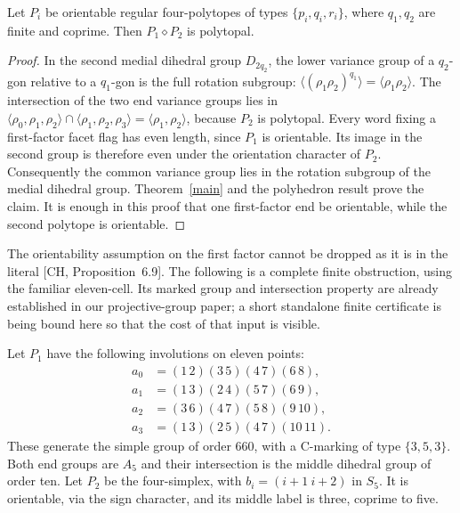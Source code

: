 \documentclass[a4paper,11pt]{article}
\newcommand{\gen}[1]{\langle#1\rangle}\newcommand{\Aut}{\operatorname{Aut}}
\newcommand{\mix}{\mathbin{\diamond}}\newcommand{\Alt}{\operatorname{Alt}}
\begin{document}
\begin{proposition}\label{coprime}
Let $P_i$ be orientable regular four-polytopes of types
$\{p_i,q_i,r_i\}$, where $q_1,q_2$ are finite and coprime.
Then $P_1\mix P_2$ is polytopal.
\end{proposition}
\begin{proof}
In the second medial dihedral group $D_{2q_2}$, the lower variance group
of a $q_2$-gon relative to a $q_1$-gon is the full rotation subgroup:
$\gen{(\rho_1\rho_2)^{q_1}}=\gen{\rho_1\rho_2}$.
The intersection of the two end variance groups lies in
$\gen{\rho_0,\rho_1,\rho_2}\cap
\gen{\rho_1,\rho_2,\rho_3}=\gen{\rho_1,\rho_2}$,
because $P_2$ is polytopal. Every word fixing a first-factor facet flag
has even length, since $P_1$ is orientable. Its image in the second group
is therefore even under the orientation character of $P_2$.
Consequently the common variance group lies in the rotation subgroup of
the medial dihedral group. Theorem~\ref{main} and the polyhedron result
prove the claim. It is enough in this proof that one first-factor end
be orientable, while the second polytope is orientable.
\end{proof}

The orientability assumption on the first factor cannot be dropped as
it is in the literal [CH, Proposition~6.9]. The following is a complete
finite obstruction, using the familiar eleven-cell. Its marked group
and intersection property are already established in our projective-group
paper; a short standalone finite certificate is being bound here so that
the cost of that input is visible.

Let $P_1$ have the following involutions on eleven points:
\[
\begin{aligned}
 a_0&=(1\,2)(3\,5)(4\,7)(6\,8),\\
 a_1&=(1\,3)(2\,4)(5\,7)(6\,9),\\
 a_2&=(3\,6)(4\,7)(5\,8)(9\,10),\\
 a_3&=(1\,3)(2\,5)(4\,7)(10\,11).
\end{aligned}                                                    \tag{2}
\]
These generate the simple group of order $660$, with a C-marking of type
$\{3,5,3\}$. Both end groups are $A_5$ and their intersection is the
middle dihedral group of order ten. Let $P_2$ be the four-simplex, with
$b_i=(i+1\ i+2)$ in $S_5$. It is orientable, via the sign character, and
its middle label is three, coprime to five.
\end{document}
